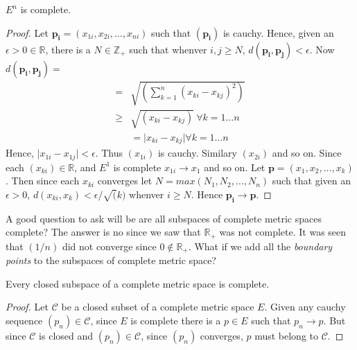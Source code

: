\begin{Corollary}
    $E^n$ is complete.
\end{Corollary}
\begin{proof}
    Let $\mathbf{p_i} = \left(x_{1i},x_{2i},\dots,x_{ni}\right)$ such that $\left(\mathbf{p_i}\right)$ 
    is cauchy. Hence, given an $\epsilon > 0 \in \mathbb{R}$, there is a $N \in \mathbb{Z}_+$ such 
    that whenver $i,j \geq N$, $d(\mathbf{p_i},\mathbf{p_j}) < \epsilon$. Now
    $d(\mathbf{p_i},\mathbf{p_j}) = $
    \begin{displaymath}
	\begin{aligned}
	    = & \sqrt{\left(\sum_{k = 1}^n (x_{ki} - x_{kj})^2 \right)}  \\
            \geq & \sqrt{\left(x_{ki} - x_{kj}\right)} \ \forall k = 1 \dots n \\
	     & = \lvert x_{ki} - x_{kj} \rvert \forall k = 1 \dots n
	\end{aligned}
    \end{displaymath}
    Hence, $\lvert x_{1i} - x_{1j} \rvert < \epsilon$. Thus $\left(x_{1i}\right)$ is cauchy.
    Similary $\left(x_{2i}\right)$ and so on. Since each $\left(x_{ki}\right) \in \mathbb{R}$, and
    $E^1$ is complete $x_{1i} \rightarrow x_1$ and so on. Let $\mathbf{p} = \left(x_1,x_2,\dots,
    x_k\right)$. Then since each $x_{ki}$ converges let $N = max(N_1,N_2,\dots,N_n)$ such that given
an $\epsilon > 0$, $d(x_{ki},x_k) < \epsilon/\sqrt(k)$ whenver $i \geq N$. Hence $\mathbf{p_i}
\rightarrow \mathbf{p}$.
\end{proof}
A good question to ask will be are all subspaces of complete metric spaces complete? The answer is
no since we saw that $\mathbb{R}_+$ was not complete. It was seen that $\left(1/n\right)$ did not 
converge since $0 \not \in \mathbb{R}_+$. What if we add all the \emph{boundary points} to the 
subspaces of complete metric space?

\begin{Proposition}[name=Closed subspace of complete spaces]
    Every closed subspace of a complete metric space is complete.
\end{Proposition}

\begin{proof}
    Let $\mathcal{C}$ be a closed subset of a complete metric space $E$. Given any cauchy sequence
    $\left(p_n\right) \in \mathcal{C}$, since $E$ is complete there is a $p \in E$ such that $p_n
\rightarrow p$. But since $\mathcal{C}$ is closed and $\left(p_n\right) \in \mathcal{C}$, since
$\left(p_n\right)$ converges, $p$ must belong to $\mathcal{C}$.
\end{proof}


